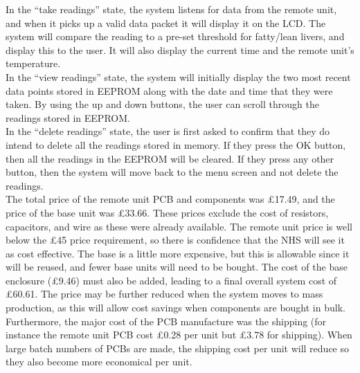 In the ``take readings'' state, the system listens for data from the remote unit, and when it picks up a valid data packet it will display it on the LCD. The system will compare the reading to a pre-set threshold for fatty/lean livers, and display this to the user. It will also display the current time and the remote unit's temperature.\\

In the ``view readings'' state, the system will initially display the two most recent data points stored in EEPROM along with the date and time that they were taken. By using the up and down buttons, the user can scroll through the readings stored in EEPROM.\\

In the ``delete readings'' state, the user is first asked to confirm that they do intend to delete all the readings stored in memory. If they press the OK button, then all the readings in the EEPROM will be cleared. If they press any other button, then the system will move back to the menu screen and not delete the readings.\\

The total price of the remote unit PCB and components was £17.49, and the price of the base unit was £33.66. These prices exclude the cost of resistors, capacitors, and wire as these were already available. The remote unit price is well below the £45 price requirement, so there is confidence that the NHS will see it as cost effective. The base is a little more expensive, but this is allowable since it will be reused, and fewer base units will need to be bought. The cost of the base enclosure (£9.46) must also be added, leading to a final overall system cost of £60.61. The price may be further reduced when the system moves to mass production, as this will allow cost savings when components are bought in bulk. Furthermore, the major cost of the PCB manufacture was the shipping (for instance the remote unit PCB cost £0.28 per unit but £3.78 for shipping). When large batch numbers of PCBs are made, the shipping cost per unit will reduce so they also become more economical per unit.\\
